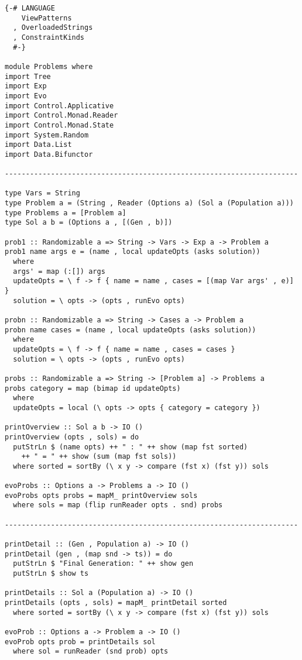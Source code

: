 \documentclass{article}
\begin{document}
\begin{lstlisting}
{-# LANGUAGE
    ViewPatterns
  , OverloadedStrings
  , ConstraintKinds
  #-}

module Problems where
import Tree
import Exp
import Evo
import Control.Applicative
import Control.Monad.Reader
import Control.Monad.State
import System.Random
import Data.List
import Data.Bifunctor

----------------------------------------------------------------------

type Vars = String
type Problem a = (String , Reader (Options a) (Sol a (Population a)))
type Problems a = [Problem a]
type Sol a b = (Options a , [(Gen , b)])

prob1 :: Randomizable a => String -> Vars -> Exp a -> Problem a
prob1 name args e = (name , local updateOpts (asks solution))
  where
  args' = map (:[]) args
  updateOpts = \ f -> f { name = name , cases = [(map Var args' , e)] }
  solution = \ opts -> (opts , runEvo opts)

probn :: Randomizable a => String -> Cases a -> Problem a
probn name cases = (name , local updateOpts (asks solution))
  where
  updateOpts = \ f -> f { name = name , cases = cases }
  solution = \ opts -> (opts , runEvo opts)

probs :: Randomizable a => String -> [Problem a] -> Problems a
probs category = map (bimap id updateOpts)
  where
  updateOpts = local (\ opts -> opts { category = category })

printOverview :: Sol a b -> IO ()
printOverview (opts , sols) = do
  putStrLn $ (name opts) ++ " : " ++ show (map fst sorted)
    ++ " = " ++ show (sum (map fst sols))
  where sorted = sortBy (\ x y -> compare (fst x) (fst y)) sols

evoProbs :: Options a -> Problems a -> IO ()
evoProbs opts probs = mapM_ printOverview sols
  where sols = map (flip runReader opts . snd) probs

----------------------------------------------------------------------

printDetail :: (Gen , Population a) -> IO ()
printDetail (gen , (map snd -> ts)) = do
  putStrLn $ "Final Generation: " ++ show gen
  putStrLn $ show ts

printDetails :: Sol a (Population a) -> IO ()
printDetails (opts , sols) = mapM_ printDetail sorted
  where sorted = sortBy (\ x y -> compare (fst x) (fst y)) sols

evoProb :: Options a -> Problem a -> IO ()
evoProb opts prob = printDetails sol
  where sol = runReader (snd prob) opts


\end{lstlisting}
\end{document}
